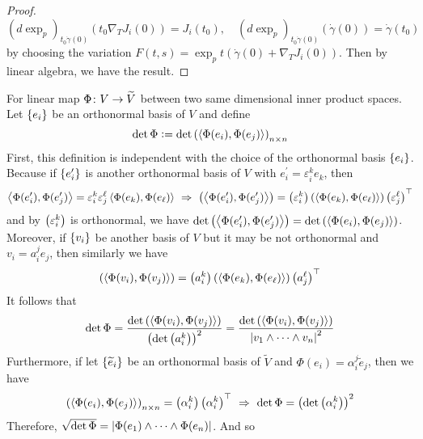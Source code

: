 \begin{enumerate}[label=\arabic{*}]
\begin{proof}
\begin{equation*}
			(d\exp_p)_{t_0\dot{\gamma}(0)}(t_0\nabla_TJ_i(0)) = J_i(t_0),\quad (d\exp_p)_{t_0\dot{\gamma}(0)}(\dot{\gamma}(0)) =\dot{\gamma}(t_0) 
		\end{equation*}
		by choosing the variation $F(t,s) = \exp_pt(\dot{\gamma}(0)+ \nabla_TJ_i(0))$. Then by linear algebra, we have the result.
	\end{proof}
	\begin{rmk}
		For linear map $\Phi \colon V \rightarrow \widetilde{V}$ between two same dimensional inner product spaces. Let $\left\{e_i\right\}$ be an orthonormal basis of $V$ and define
		\begin{equation*}
			\det \Phi \vcentcolon= \det \left(\left\langle \Phi(e_i),\Phi(e_j) \right\rangle\right)_{n\times n}
		\end{equation*}
		First, this definition is independent with the choice of the orthonormal basis $\left\{e_i\right\}$. Because if $\left\{e_i^\prime\right\}$ is another orthonormal basis of $V$ with $e_i^\prime = \varepsilon_i^ke_k$, then
		\begin{equation*}
			\left\langle \Phi(e_i^\prime),\Phi(e_j^\prime) \right\rangle = \varepsilon_i^k\varepsilon_j^\ell\left\langle \Phi(e_k),\Phi(e_\ell) \right\rangle ~\Rightarrow~ \left(\left\langle \Phi(e_i^\prime),\Phi(e_j^\prime) \right\rangle\right) = \left(\varepsilon_i^k\right)\left(\left\langle \Phi(e_k),\Phi(e_\ell) \right\rangle\right)\left(\varepsilon_j^\ell\right)^\top
		\end{equation*}
		and by $\left(\varepsilon_i^k\right)$ is orthonormal, we have $\det \left(\left\langle \Phi(e_i^\prime),\Phi(e_j^\prime) \right\rangle\right) = \det \left(\left\langle \Phi(e_i),\Phi(e_j) \right\rangle\right)$. Moreover, if $\left\{v_i\right\}$ be another basis of $V$ but it may be not orthonormal and $v_i = a_i^je_j$, then similarly we have
		\begin{equation*}
			\left(\left\langle \Phi(v_i),\Phi(v_j) \right\rangle\right) = \left(a_i^k\right)\left(\left\langle \Phi(e_k),\Phi(e_\ell) \right\rangle\right)\left(a_j^\ell\right)^\top
		\end{equation*}
		It follows that
		\begin{equation*}
			\det \Phi = \frac{\det \left(\left\langle \Phi(v_i),\Phi(v_j) \right\rangle\right)}{\left(\det \left(a_i^k\right)\right)^2} =  \frac{\det \left(\left\langle \Phi(v_i),\Phi(v_j) \right\rangle\right)}{\left\lvert v_1\wedge \cdots \wedge v_n\right\lvert^2}
		\end{equation*}
		Furthermore, if let $\left\{\widetilde{e}_i\right\}$ be an orthonormal basis of $\widetilde{V}$ and $\Phi(e_i) = \alpha_i^j\widetilde{e}_j$, then we have
		\begin{equation*}
			\left(\left\langle \Phi(e_i),\Phi(e_j) \right\rangle\right)_{n\times n} = \left(\alpha_i^k\right)\left(\alpha_i^k\right)^\top~\Rightarrow~\det \Phi = \left(\det\left(\alpha_i^k\right)\right)^2
		\end{equation*}
		Therefore, $\sqrt{\det \Phi} = \left\lvert\Phi(e_1)\wedge \cdots\wedge \Phi(e_n)\right\lvert$. And so

\end{rmk}
\end{enumerate}
